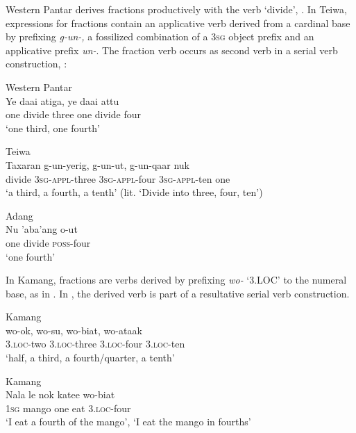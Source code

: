 Western Pantar derives fractions productively with the verb `divide', . In Teiwa, expressions for fractions contain an applicative verb derived from a cardinal base by prefixing \textit{g-un-,} a fossilized combination of a 3\textsc{sg} object prefix and an applicative prefix \textit{un-}. The fraction verb occurs as second verb in a serial verb construction, : 


\ea%
\label{bkm:Ref342746525}
{\upshape Western Pantar}\\
\gll   Ye  daai  atiga,  ye   daai  attu\\  
   one   divide  three   one  divide  four \\
\glt  `one third, one fourth'   
\z

 

\ea%
\label{bkm:Ref342746583}
{\upshape Teiwa}\\
\gll  Taxaran  g-un-yerig,  g-un-ut,  g-un-qaar nuk \\  
   divide  \textsc{3sg}-\textsc{appl}-three  \textsc{3sg}-\textsc{appl}-four  \textsc{3sg}-\textsc{appl}-ten one   \\
\glt  `a third, a fourth, a tenth' (lit. `Divide into three, four, ten')
\z


 

\ea
\label{ex:8:1248}
{\upshape Adang}\\
\gll Nu  'aba'ang  o-ut\\
  one  divide  \textsc{poss}{}-four\\
\glt `one fourth'
\z 

  

In Kamang, fractions are verbs derived by prefixing \textit{wo-} `3.LOC' to the numeral base, as in . In , the derived verb is part of a resultative serial verb construction.


\ea%
\label{bkm:Ref342746224}
{\upshape Kamang}\\
\gll wo-ok,    wo-su,  wo-biat,  wo-ataak     \\  
   3.\textsc{loc}-two    3.\textsc{loc}-three  3.\textsc{loc}-four  3.\textsc{loc}-ten   \\
\glt `half, a third, a fourth/quarter, a tenth' 
\z

   

 

 


\ea%
\label{bkm:Ref342746258}
{\upshape Kamang}\\
\gll  Nala  le  nok  katee  wo-biat  \\  
   \textsc{1sg} mango  one  eat  3.\textsc{loc}-four    \\
\glt `I eat a fourth of the mango', `I eat the mango in fourths'
\z

